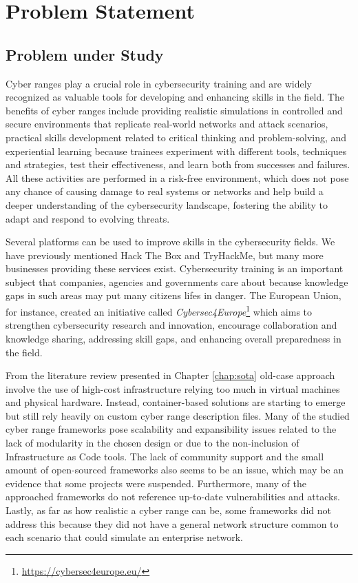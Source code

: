 \chapter{Problem Statement}\label{chap:problem_statement}

\minitoc

\section{Problem under Study} \label{sec:research_problem}

Cyber ranges play a crucial role in cybersecurity training and are widely recognized as valuable tools for developing and enhancing skills in the field. The benefits of cyber ranges include providing realistic simulations in controlled and secure environments that replicate real-world networks and attack scenarios, practical skills development related to critical thinking and problem-solving, and experiential learning because trainees experiment with different tools, techniques and strategies, test their effectiveness, and learn both from successes and failures. All these activities are performed in a risk-free environment, which does not pose any chance of causing damage to real systems or networks and help build a deeper understanding of the cybersecurity landscape, fostering the ability to adapt and respond to evolving threats. 

Several platforms can be used to improve skills in the cybersecurity fields. We have previously mentioned Hack The Box and TryHackMe, but many more businesses providing these services exist. Cybersecurity training is an important subject that companies, agencies and governments care about because knowledge gaps in such areas may put many citizens lifes in danger. The European Union, for instance, created an initiative called \textit{Cybersec4Europe}\footnote{\url{https://cybersec4europe.eu/}} which aims to strengthen cybersecurity research and innovation, encourage collaboration and knowledge sharing, addressing skill gaps, and enhancing overall preparedness in the field. 

From the literature review presented in Chapter \ref{chap:sota} old-case approach involve the use of high-cost infrastructure relying too much in virtual machines and physical hardware. Instead, container-based solutions are starting to emerge but still rely heavily on custom cyber range description files. Many of the studied cyber range frameworks pose scalability and expansibility issues related to the lack of modularity in the chosen design or due to the non-inclusion of Infrastructure as Code tools. The lack of community support and the small amount of open-sourced frameworks also seems to be an issue, which may be an evidence that some projects were suspended. Furthermore, many of the approached frameworks do not reference up-to-date vulnerabilities and attacks. Lastly, as far as how realistic a cyber range can be, some frameworks did not address this because they did not have a general network structure common to each scenario that could simulate an enterprise network. 

